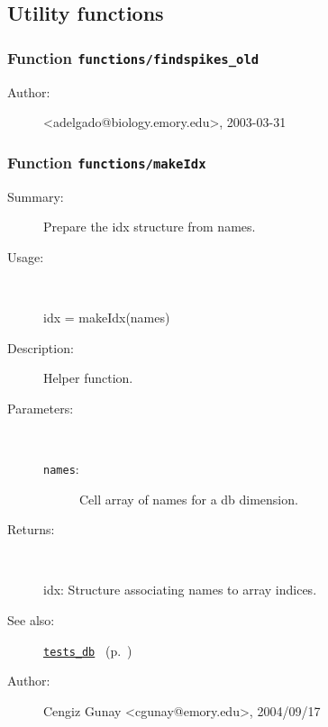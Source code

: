 \subsection{Utility functions}%
\label{ref_utils}%
\hypertarget{ref_utils}{}%
\subsubsection[Function \texttt{findspikes\_old}]{Function \texttt{functions/findspikes\_old}}%
%
\label{ref_functions__findspikes_old}%
\hypertarget{ref_functions__findspikes_old}{}%
\begin{description}
%
%
%
%
%
%
%
\item[Author:]%
<adelgado@biology.emory.edu>, 2003-03-31%
\end{description}
\methodline%
\subsubsection[Function \texttt{makeIdx}]{Function \texttt{functions/makeIdx}}%
%
\label{ref_functions__makeIdx}%
\hypertarget{ref_functions__makeIdx}{}%
\begin{description}
\item[Summary:]Prepare the idx structure from names.
%
\item[Usage:]~%
\begin{lyxcode}%
idx = makeIdx(names)
%
\end{lyxcode}%
%
\item[Description:]%
Helper function.
\item[Parameters:]~
\begin{description}%
\item[\texttt{names}:]
 Cell array of names for a db dimension.
\end{description}%
%
\item[Returns:]~

	idx: Structure associating names to array indices.
%
%
\item[See also:]%
\hyperlink{ref_tests_db}{\texttt{tests\_db}}%
\ (p.~\pageref{ref_tests_db})%
%
%
\item[Author:]%
Cengiz Gunay <cgunay@emory.edu>, 2004/09/17%
\end{description}
\methodline%
